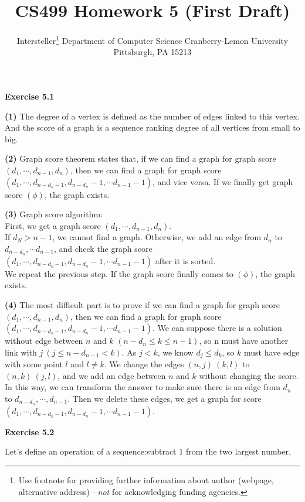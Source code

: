 \documentclass{article} %
\title{CS499 Homework 5 (First Draft)}
\author{
	Intersteller\thanks{ Use footnote for providing further information
		about author (webpage, alternative address)---\emph{not} for acknowledging
		funding agencies.}
	Department of Computer Science
	Cranberry-Lemon University
	Pittsburgh, PA 15213
}
\begin{document}
	\maketitle
	\textbf{Exercise 5.1}\par

\textbf{(1)} The degree of a vertex is defined as the number of edges linked to this vertex. And the score of a graph is a sequence ranking degree of all vertices from small to big.\par

\textbf{(2)} Graph score theorem states that, if we can find a graph for graph score $(d_1, \cdots ,d_{n-1},d_n)$, then we can find a graph for graph score $(d_1, \cdots ,d_{n-d_n-1},d_{n-d_n}-1,\cdots d_{n-1}-1)$, and vice versa. If we finally get graph score $(\phi)$, the graph exists.\par

\textbf{(3)} Graph score algorithm:\\
First, we get a graph score $(d_1, \cdots ,d_{n-1},d_n)$.\\
If $d_N>n-1$, we cannot find a graph. Otherwise, we add an edge from $d_n$ to $d_{n-d_n},\cdots d_{n-1}$, and check the graph score $(d_1, \cdots ,d_{n-d_n-1},d_{n-d_n}-1,\cdots d_{n-1}-1)$ after it is sorted.\\
We repeat the previous step. If the graph score finally comes to $(\phi)$, the graph exists.\par

\textbf{(4)} The most difficult part is to prove if we can find a graph for graph score $(d_1, \cdots ,d_{n-1},d_n)$, then we can find a graph for graph score $(d_1, \cdots ,d_{n-d_n-1},d_{n-d_n}-1,\cdots d_{n-1}-1)$. We can suppose there is a solution without edge between $n$ and $k$ $(n-d_n\leq k\leq n-1)$, so n must have another link with $j \ (j\leq n-d_{n-1}<k)$. As $j<k$, we know $d_j\leq d_k$, so $k$ must have edge with some point $l$ and $l\neq k$. We change the edges $(n,j)\  (k,l)$ to $(n,k)\  (j,l)$, and we add an edge between $n$ and $k$ without changing the score. In this way, we can transform the answer to make sure there is an edge from $d_n$ to $d_{n-d_n},\cdots ,d_{n-1}$. Then we delete these edges, we get a graph for score $(d_1, \cdots ,d_{n-d_n-1},d_{n-d_n}-1,\cdots d_{n-1}-1)$.\par

\textbf{Exercise 5.2}\par
	Let's define an operation of a sequence:subtract 1 from the two largest number. \par
\end{document}
